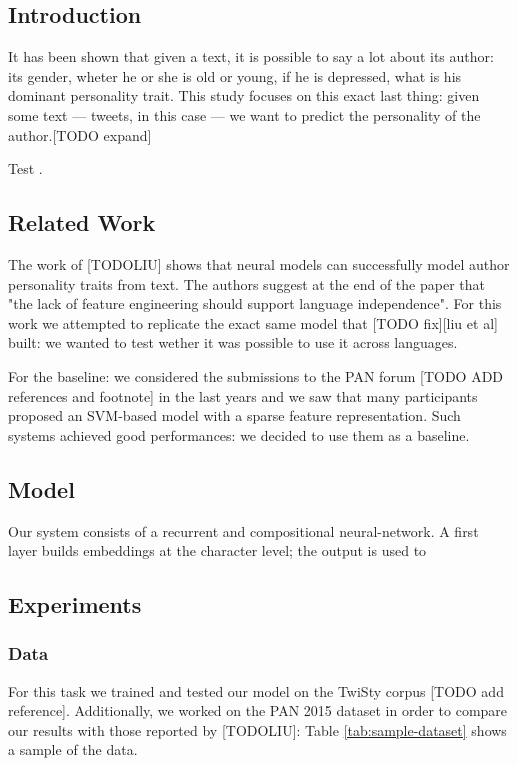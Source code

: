 \documentclass[article,11pt,nofixltx2e]{article}
\begin{document}
\subsection{Introduction}
\label{sec-2-1}

It has been shown that given a text, it is possible to say a lot about its author: its gender, wheter he or she is old or young, if he is depressed, what is his dominant personality trait. This study focuses on this exact last thing: given some text --- tweets, in this case --- we want to predict the personality of the author.[TODO expand]

Test \cite{DBLP:journals/corr/LiuPN16}.

\subsection{Related Work}
\label{sec-2-2}

The work of [TODOLIU] shows that neural models can successfully model author personality traits from text. The authors suggest at the end of the paper that "the lack of feature engineering should support language independence". For this work we attempted to replicate the exact same model that [TODO fix][liu et al] built: we wanted to test wether it was possible to use it across languages.

For the baseline: we considered the submissions to the PAN forum [TODO ADD references and footnote] in the last years and we saw that many participants proposed an SVM-based model with a sparse feature representation. Such systems achieved good performances: we decided to use them as a baseline.

\subsection{Model}
\label{sec-2-3}

Our system consists of a recurrent and compositional neural-network. A first layer builds embeddings at the character level; the output is used to 

\subsection{Experiments}
\label{sec-2-4}
\subsubsection{Data}
\label{sec-2-4-1}

For this task we trained and tested our model on the TwiSty corpus [TODO add reference]. Additionally, we worked on the PAN 2015 dataset in order to compare our results with those reported by [TODOLIU]: Table \ref{tab:sample-dataset} shows a sample of the data.
\end{document}
